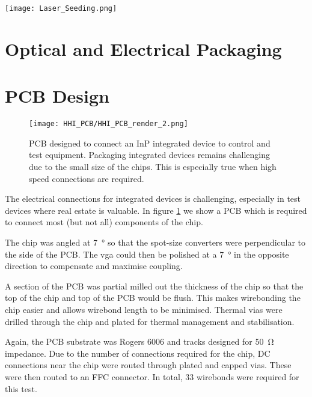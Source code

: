\begin{sidewaysfigure}
	\centering
	\texttt{[image: Laser\_Seeding.png]}
	\caption[InP laser seeding transmitter with QRNG]{This shows the layout of the laser seeded transmitter device fabricated by HHI. The chip measures \SI[product-units=power]{6x4}{mm} and contains two laser seeding prototype circuits, a homodyne \ac{qrng} and test structure to measure laser and waveguide performances. This demonstrates the complexity and compactness possible in the integrated platform.}
	\label{fig:hhi_laser_seeding}
\end{sidewaysfigure}

\section{Optical and Electrical Packaging}

\section{PCB Design}

\begin{figure}[tbp]
	\centering
	\texttt{[image: HHI\_PCB/HHI\_PCB\_render\_2.png]}
	\caption[PCB breakout for an InP integrated circuit]{PCB designed to connect an \ac{InP} integrated device to control and test equipment. Packaging integrated devices remains challenging due to the small size of the chips. This is especially true when high speed connections are required.}
	\label{fig:hhi_pcb}
\end{figure}

The electrical connections for integrated devices is challenging, especially in test devices where real estate is valuable. In figure \ref{fig:hhi_pcb} we show a PCB which is required to connect most (but not all) components of the chip. 

The chip was angled at \SI{7}{\degree} so that the spot-size converters were perpendicular to the side of the PCB. The \ac{vga} could then be polished at a \SI{7}{\degree} in the opposite direction to compensate and maximise coupling.

A section of the PCB was partial milled out the thickness of the chip so that the top of the chip and top of the PCB would be flush. This makes wirebonding the chip easier and allows wirebond length to be minimised. Thermal vias were drilled through the chip and plated for thermal management and stabilisation. 

Again, the PCB substrate was Rogers 6006 and tracks designed for \SI{50}{\ohm} impedance. Due to the number of connections required for the chip, DC connections near the chip were routed through plated and capped vias. These were then routed to an FFC connector. In total, 33 wirebonds were required for this test.

